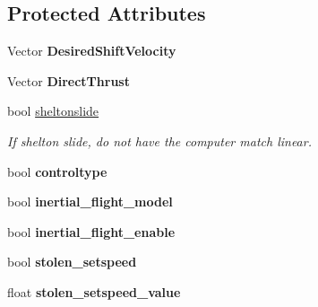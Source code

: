 \subsection*{Protected Attributes}
\begin{DoxyCompactItemize}
\item 
Vector {\bfseries Desired\+Shift\+Velocity}\hypertarget{classFlyByWire_a0613fc81986fb77ce6df328d68145201}{}\label{classFlyByWire_a0613fc81986fb77ce6df328d68145201}

\item 
Vector {\bfseries Direct\+Thrust}\hypertarget{classFlyByWire_a0753a76934bad3f22ccc6758a76ab5c3}{}\label{classFlyByWire_a0753a76934bad3f22ccc6758a76ab5c3}

\item 
bool \hyperlink{classFlyByWire_ab4d7371aa25c9714effd69abaf4595f2}{sheltonslide}\hypertarget{classFlyByWire_ab4d7371aa25c9714effd69abaf4595f2}{}\label{classFlyByWire_ab4d7371aa25c9714effd69abaf4595f2}

\begin{DoxyCompactList}\small\item\em If shelton slide, do not have the computer match linear. \end{DoxyCompactList}\item 
bool {\bfseries controltype}\hypertarget{classFlyByWire_ae113d29bc358d047ff657cfa52507ae4}{}\label{classFlyByWire_ae113d29bc358d047ff657cfa52507ae4}

\item 
bool {\bfseries inertial\+\_\+flight\+\_\+model}\hypertarget{classFlyByWire_affd1a8888199f1deb3b5531979f8a512}{}\label{classFlyByWire_affd1a8888199f1deb3b5531979f8a512}

\item 
bool {\bfseries inertial\+\_\+flight\+\_\+enable}\hypertarget{classFlyByWire_adb29bbf8bbd933a99acf00d858b3eb87}{}\label{classFlyByWire_adb29bbf8bbd933a99acf00d858b3eb87}

\item 
bool {\bfseries stolen\+\_\+setspeed}\hypertarget{classFlyByWire_a0006e4dbddb9c9ac966c9a6951b5525c}{}\label{classFlyByWire_a0006e4dbddb9c9ac966c9a6951b5525c}

\item 
float {\bfseries stolen\+\_\+setspeed\+\_\+value}\hypertarget{classFlyByWire_a15747b2d6555e33ff7af0f820553dfa3}{}\label{classFlyByWire_a15747b2d6555e33ff7af0f820553dfa3}

\end{DoxyCompactItemize}
